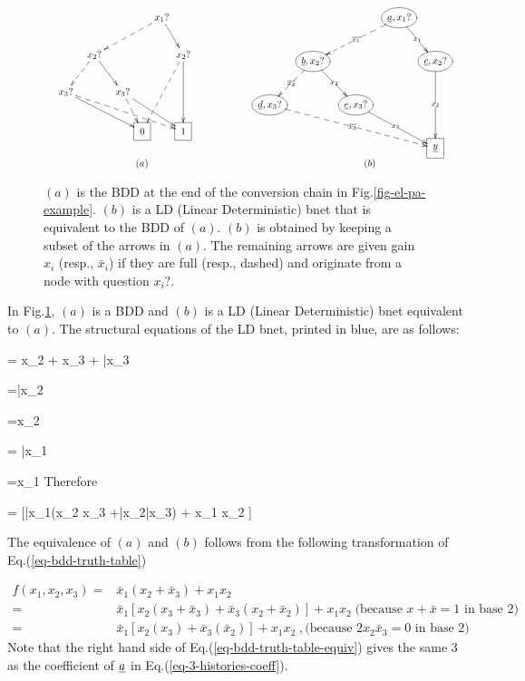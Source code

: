 \begin{figure}[h!]
$$
\begin{array}{cc}
\xymatrix@C=.1pc{
&&&&&&&x_1?\ar@{-->}[dllll]
\ar[dr]
\\
&&&x_2?\ar@{-->}[dll]\ar[drr]
&&&&&x_2?\ar@{-->}[ddll]\ar[dd]
\\
&x_3?\ar@{-->}[drrrrrrr]\ar[drrrrr]
&&&&x_3?\ar@{-->}[dr]\ar[drrr]
\\
&&
&&
&&\Rect{0}
&&\Rect{1}
&&
&&
&&
}
&
\xymatrix@C=.1pc{
&&&&&&&\Circle{\rva, x_1?}\ar@{-->}[dllll]|{\ol{x_1}}
\ar[dr]|{x_1}
\\
&&&\Circle{\rvb, x_2?}\ar@{-->}[dll]|{\ol{x_2}}\ar[drr]|{x_2}
&&&&&\Circle{\rvc, x_2?}\ar[dd]|{x_2}
\\
&\Circle{\rvd, x_3?}\ar@{-->}[drrrrrrr]|{\ol{x_3}}
&&&&\Circle{\rve, x_3?}\ar[drrr]|{x_3}
\\
&&
&&
&&
&&\Rect{\ul{y}}
&&
&&
&&
}
\\
(a) & (b)
\end{array}
$$
\caption{
$(a)$ 
is the BDD 
at the end of the
conversion chain in  Fig.\ref{fig-el-pa-example}.
$(b)$ 
is a LD (Linear Deterministic) bnet that
is equivalent to the BDD of
$(a)$. $(b)$ is
obtained by keeping a subset of the arrows in $(a)$. The remaining
arrows are given gain $x_i$
(resp., $\bar{x}_i$) if they are full 
(resp., dashed) and originate from
a node with question $x_i?$.
}
\label{fig-bdd-to-bnet}
\end{figure}




In Fig.\ref{fig-bdd-to-bnet}, $(a)$
is a BDD and 
$(b)$ is a LD (Linear Deterministic) bnet equivalent to $(a)$.
The structural equations of the LD bnet, printed in blue,
are as follows:

\beq\color{blue}
\rvy=  x_2 \rvc + x_3 \rve + \bar{x}_3\rvd
\eeq

\beq\color{blue}
\rvd=\bar{x}_2\rvb
\eeq

\beq\color{blue}
\rve=x_2\rvb
\eeq

\beq\color{blue}
\rvb = \bar{x}_1\rva
\eeq

\beq\color{blue}
\rvc=x_1\rva
\eeq
Therefore

\beq
\rvy = [\bar{x}_1(x_2 x_3 +\bar{x}_2\bar{x}_3)
+ x_1 x_2
]\rva
\label{eq-3-histories-coeff}
\eeq

The equivalence of $(a)$ and $(b)$
follows from the following transformation
of Eq.(\ref{eq-bdd-truth-table})

\begin{align}
f(x_1, x_2,x_3) =&
\bar{x}_1(x_2+\bar{x}_3)  + x_1 x_2
\\
=&
\bar{x}_1[x_2(x_3+\bar{x}_3)+\bar{x}_3
(x_2+ \bar{x}_2)]  + x_1 x_2
\;\text{(because $x+\bar{x}=1$ in base 2)}
\\
=&
\bar{x}_1[x_2(x_3)+\bar{x}_3
(\bar{x}_2)]  + x_1 x_2\;, \text{
(because $2x_2\bar{x}_3=0$ in base 2)
}
\label{eq-bdd-truth-table-equiv}
\end{align}
Note that the right 
hand side of Eq.(\ref{eq-bdd-truth-table-equiv})
gives the same 3 
as the coefficient of $\rva$ in
 Eq.(\ref{eq-3-histories-coeff}).

